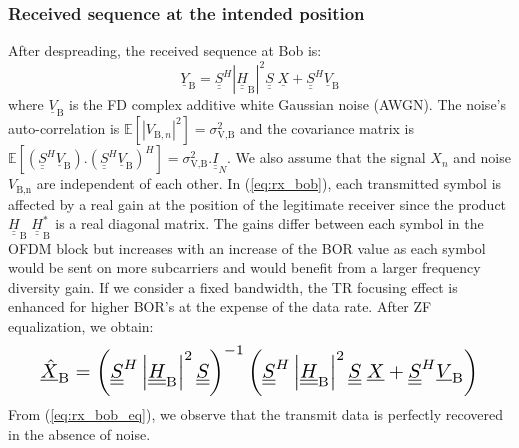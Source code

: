 \documentclass[a4paper,11pt]{article}
\def\uu#1{\underline{\underline{#1}}}
\begin{document}
\subsubsection{Received sequence at the intended position}
After despreading, the received sequence at Bob is:
\begin{equation}
    \underline{Y}_{\text{B}} = \underline{\underline{S}}^H  \left|\underline{\underline{H}}_{\text{B}} \right|^2\underline{\underline{S}}\; \underline{X} +  \underline{\underline{S}}^H \underline{V}_\text{B} 
    \label{eq:rx_bob}
\end{equation}
where $\underline{V}_\text{B}$ is the FD complex additive white Gaussian noise (AWGN). The noise's auto-correlation is $\mathbb{E}[ \left|V_{\text{B},n}\right|^2 ]  = \sigma_{\text{V,B}}^2$ and the covariance matrix is $\mathbb{E}[(\uu{S}^H  \underline{V}_\text{B}) . (\uu{S}^H \underline{V}_\text{B})^H ] = \sigma_{\text{V,B}}^2 . \uu{I}_N$. We also assume that the signal $X_n$ and noise $V_{\text{B,n}}$ are independent of each other. In (\ref{eq:rx_bob}), each transmitted symbol is affected by a real gain at the position of the legitimate receiver since the product $\uu{H}_{\text{B}}\;\uu{H}^*_{\text{B}}$ is a real diagonal matrix. The gains differ between each symbol in the OFDM block but increases with an increase of the BOR value as each symbol would be sent on more subcarriers and would benefit from a larger frequency diversity gain. If we consider a fixed bandwidth, the TR focusing effect is enhanced for higher BOR's at the expense of the data rate. After ZF equalization, we obtain:
\begin{equation}
\resizebox{0.91\hsize}{!}{$
    \underline{\hat{X}}_{\text{B}} = \left(\underline{\underline{S}}^H  \left|\underline{\underline{H}}_{\text{B}} \right|^2\underline{\underline{S}}\right)^{-1} \left(\underline{\underline{S}}^H  \left|\underline{\underline{H}}_{\text{B}} \right|^2\underline{\underline{S}}\; \underline{X} +  \underline{\underline{S}}^H \underline{V}_\text{B}\right)$}
    \label{eq:rx_bob_eq}
\end{equation}
From (\ref{eq:rx_bob_eq}), we observe that the transmit data is perfectly recovered in the absence of noise.
\end{document}
